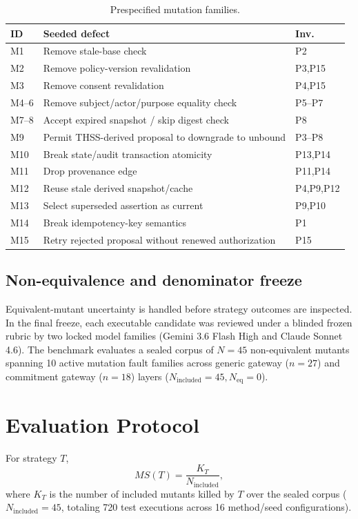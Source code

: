 \documentclass[conference]{IEEEtran}
\begin{document}
\begin{table}[t]
\caption{Prespecified mutation families.}
\label{tab:mut}
\centering\scriptsize
\setlength{\tabcolsep}{2pt}
\begin{tabular}{p{}p{}p{}}
\toprule
ID & Seeded defect & Inv. \\
\midrule
M1 & Remove stale-base check & P2 \\
M2 & Remove policy-version revalidation & P3,P15 \\
M3 & Remove consent revalidation & P4,P15 \\
M4--6 & Remove subject/actor/purpose equality check & P5--P7 \\
M7--8 & Accept expired snapshot / skip digest check & P8 \\
M9 & Permit THSS-derived proposal to downgrade to unbound & P3--P8 \\
M10 & Break state/audit transaction atomicity & P13,P14 \\
M11 & Drop provenance edge & P11,P14 \\
M12 & Reuse stale derived snapshot/cache & P4,P9,\allowbreak P12 \\
M13 & Select superseded assertion as current & P9,P10 \\
M14 & Break idempotency-key semantics & P1 \\
M15 & Retry rejected proposal without renewed authorization & P15 \\
\bottomrule
\end{tabular}
\end{table}

\subsection{Non-equivalence and denominator freeze}
Equivalent-mutant uncertainty is handled before strategy outcomes are inspected. In the final freeze, each executable candidate was reviewed under a blinded frozen rubric by two locked model families (Gemini 3.6 Flash High and Claude Sonnet 4.6). The benchmark evaluates a sealed corpus of $N=45$ non-equivalent mutants spanning 10 active mutation fault families across generic gateway ($n = 27$) and commitment gateway ($n = 18$) layers ($N_{\mathrm{included}} = 45, N_{\mathrm{eq}} = 0$).

\section{Evaluation Protocol}
For strategy $T$,
\begin{equation}
MS(T)=\frac{K_T}{N_{\mathrm{included}}},
\end{equation}
where $K_T$ is the number of included mutants killed by $T$ over the sealed corpus ($N_{\mathrm{included}}=45$, totaling 720 test executions across 16 method/seed configurations).
\end{document}
